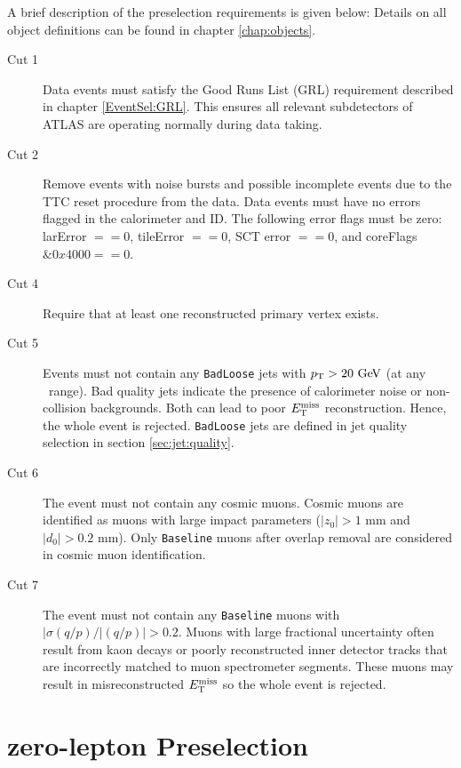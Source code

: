 \indent A brief description of the preselection requirements is given below: Details on all object definitions can be found in chapter \ref{chap:objects}. \\

\begin{description}
\item[Cut 1] Data events must satisfy the Good Runs List (GRL) requirement described in chapter \ref{EventSel:GRL}.  This ensures all relevant subdetectors of ATLAS are operating normally during data taking. 
\item[Cut 2] Remove events with noise bursts and possible incomplete events due to the TTC reset procedure from the data. Data events must have no errors flagged in the calorimeter and ID.  The following error flags must be zero: larError $== 0$, tileError $== 0$, SCT error $==0$, and coreFlags $\&0x4000 == 0$.
\item[Cut 4] Require that at least one reconstructed primary vertex exists.
\item[Cut 5] Events must not contain any {\tt BadLoose} jets with $\pT > 20 \gev$ (at any \eta\ range). Bad quality jets indicate the presence of calorimeter noise or non-collision backgrounds. Both can lead to poor $E_{\mathrm{T}}^{\mathrm{miss}}$ reconstruction. Hence, the whole event is rejected.  {\tt BadLoose} jets are defined in jet quality selection in section \ref{sec:jet:quality}.  
\item[Cut 6] The event must not contain any cosmic muons.  Cosmic muons are identified as muons with large impact parameters  ($|z_0| > 1$ mm and $|d_0| > 0.2$ mm).  Only {\tt Baseline} muons after overlap removal are considered in cosmic muon identification.
\item[Cut 7] The event must not contain any {\tt Baseline} muons with $|\sigma(q/p)/|(q/p)| > 0.2$.  Muons with large fractional uncertainty often result from kaon decays or poorly reconstructed inner detector tracks that are incorrectly matched to muon spectrometer segments. These muons may result in misreconstructed $E_{\mathrm{T}}^{\mathrm{miss}}$ so the whole event is rejected.
\end{description}


\section{zero-lepton Preselection}

